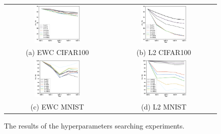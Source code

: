 \documentclass[final]{cvpr}
\begin{document}
\begin{figure}[t]
    \centering
	\begin{tabular}{c@{\hskip0.5cm}c}
		\includegraphics[width=0.45\textwidth]{resources/ewc_CIFAR.eps}&%
        \includegraphics[width=0.45\textwidth]{resources/l2_CIFAR.eps}\\%
        (a) EWC CIFAR100 & (b) L2 CIFAR100\\
        \includegraphics[width=0.45\textwidth]{resources/ewc_MNIST.eps}&%
        \includegraphics[width=0.45\textwidth]{resources/l2_MNIST.eps}\\%
		(c) EWC MNIST  & (d) L2 MNIST \\
	\end{tabular}\vspace{0.2cm}
	\caption{The results of the hyperparameters searching experiments.}
    \label{hyper}
\end{figure}
\end{document}

